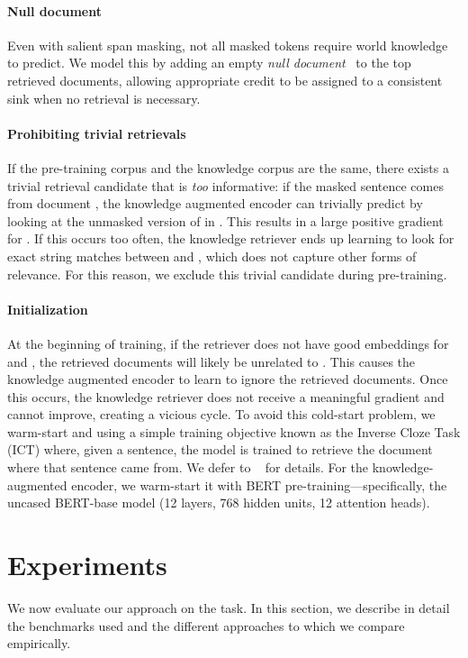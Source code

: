 \documentclass{article}
\begin{document}
\paragraph{Null document}
Even with salient span masking, not all masked tokens require world knowledge to predict. We model this by adding an empty \emph{null document} ~to the top  retrieved documents, allowing appropriate credit to be assigned to a consistent sink when no retrieval is necessary.

\paragraph{Prohibiting trivial retrievals}
If the pre-training corpus  and the knowledge corpus  are the same, there exists a trivial retrieval candidate  that is \emph{too} informative: if the masked sentence  comes from document , the knowledge augmented encoder can trivially predict  by looking at the unmasked version of  in . This results in a large positive gradient for . If this occurs too often, the knowledge retriever ends up learning to look for exact string matches between  and , which does not capture other forms of relevance. For this reason, we exclude this trivial candidate during pre-training.

\paragraph{Initialization}
At the beginning of training, if the retriever does not have good embeddings for  and , the retrieved documents  will likely be unrelated to . This causes the knowledge augmented encoder to learn to ignore the retrieved documents. Once this occurs, the knowledge retriever does not receive a meaningful gradient and cannot improve, creating a vicious cycle. To avoid this cold-start problem, we warm-start  and  using a simple training objective known as the Inverse Cloze Task (ICT) where, given a sentence, the model is trained to retrieve the document where that sentence came from. We defer to ~\citet{orqa} for details. For the knowledge-augmented encoder, we warm-start it with BERT pre-training---specifically, the uncased BERT-base model (12 layers, 768 hidden units, 12 attention heads).
 \section{Experiments} \label{sec:experiments}


We now evaluate our approach on the \openqa task.
In this section, we describe in detail the benchmarks used and the different approaches to which we compare empirically.
\end{document}
